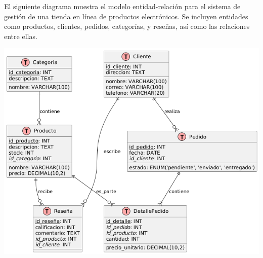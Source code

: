 
El siguiente diagrama muestra el modelo entidad-relación para el sistema de gestión de una tienda en línea de productos electrónicos. Se incluyen entidades como productos, clientes, pedidos, categorías, y reseñas, así como las relaciones entre ellas.

\vspace{1cm}

\begin{center}
    \includegraphics[width=\textwidth]{DiagramaER.png}
\end{center}
